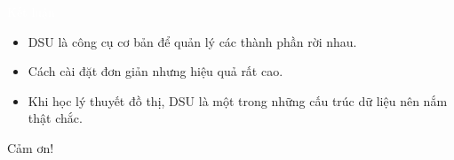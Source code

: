 \documentclass{beamer}
\newcommand{\hlorange}[1]{\textcolor{myorange}{#1}}
\newcommand{\hlwhite}[1]{\textcolor{white}{#1}}
\begin{document}

\begin{frame}{\hlwhite{Kết luận}}
\begin{itemize}
  \item DSU là công cụ cơ bản để quản lý các thành phần rời nhau.
  \item Cách cài đặt đơn giản nhưng hiệu quả rất cao.
  \item Khi học lý thuyết đồ thị, DSU là một trong những cấu trúc dữ liệu nên nắm thật chắc.
\end{itemize}

\vspace{0.2cm}
\centerline{\hlorange{Cảm ơn!}}
\end{frame}
\end{document}
